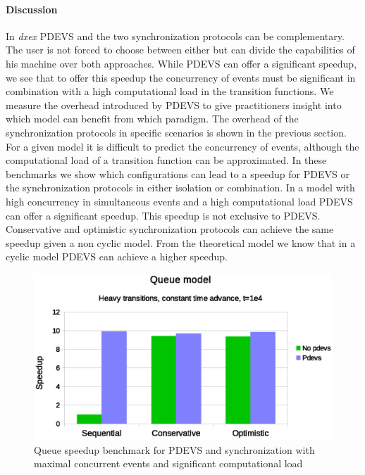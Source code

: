 \paragraph{Discussion}
In \textit{dxex} PDEVS and the two synchronization protocols can be complementary. 
The user is not forced to choose between either but can divide the capabilities of his machine over both approaches.
While PDEVS can offer a significant speedup, we see that to offer this speedup the concurrency of events must be significant in combination with a high computational load in the transition functions. 
We measure the overhead introduced by PDEVS to give practitioners insight into which model can benefit from which paradigm.
The overhead of the synchronization protocols in specific scenarios  is shown in the previous section.
For a given model it is difficult to predict the concurrency of events, although the computational load of a transition function can be approximated.
In these benchmarks we show which configurations can lead to a speedup for PDEVS or the synchronization protocols in either isolation or combination.
In a model with high concurrency in simultaneous events and a high computational load PDEVS can offer a significant speedup.
This speedup is not exclusive to PDEVS. Conservative and optimistic synchronization protocols can achieve the same speedup given a non cyclic model. 
From the theoretical model we know that in a cyclic model PDEVS can achieve a higher speedup.


\begin{figure}
	\center
	\includegraphics[width=\columnwidth]{fig/pdevs_fixed_sleep.eps}
	\caption{Queue speedup benchmark for PDEVS and synchronization with maximal concurrent events and significant computational load}
	\label{fig:pdevs_plot_fixed_sleep}
\end{figure}

